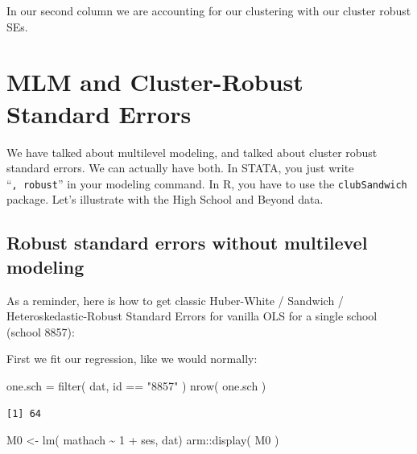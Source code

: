 \documentclass[
  letterpaper,
  DIV=11,
  numbers=noendperiod]{scrreprt}
\newenvironment{Shaded}{\begin{snugshade}}{\end{snugshade}}
\newcommand{\DecValTok}[1]{\textcolor[rgb]{0.25,0.63,0.44}{#1}}
\newcommand{\FunctionTok}[1]{\textcolor[rgb]{0.02,0.16,0.49}{#1}}
\newcommand{\NormalTok}[1]{\textcolor[rgb]{0.00,0.44,0.13}{#1}}
\newcommand{\OtherTok}[1]{\textcolor[rgb]{0.00,0.44,0.13}{#1}}
\newcommand{\SpecialCharTok}[1]{\textcolor[rgb]{0.25,0.44,0.63}{#1}}
\newcommand{\StringTok}[1]{\textcolor[rgb]{0.25,0.44,0.63}{#1}}
\begin{document}
In our second column we are accounting for our clustering with our
cluster robust SEs.

\hypertarget{mlm-and-cluster-robust-standard-errors}{%
\chapter{MLM and Cluster-Robust Standard
Errors}\label{mlm-and-cluster-robust-standard-errors}}

We have talked about multilevel modeling, and talked about cluster
robust standard errors. We can actually have both. In STATA, you just
write ``\texttt{,\ robust}'' in your modeling command. In R, you have to
use the \texttt{clubSandwich} package. Let's illustrate with the High
School and Beyond data.

\hypertarget{robust-standard-errors-without-multilevel-modeling}{%
\section{Robust standard errors without multilevel
modeling}\label{robust-standard-errors-without-multilevel-modeling}}

As a reminder, here is how to get classic Huber-White / Sandwich /
Heteroskedastic-Robust Standard Errors for vanilla OLS for a single
school (school 8857):

First we fit our regression, like we would normally:

\begin{Shaded}
\begin{Highlighting}[]
\NormalTok{one.sch }\OtherTok{=} \FunctionTok{filter}\NormalTok{( dat, id }\SpecialCharTok{==} \StringTok{"8857"}\NormalTok{ )}
\FunctionTok{nrow}\NormalTok{( one.sch )}
\end{Highlighting}
\end{Shaded}

\begin{verbatim}
[1] 64
\end{verbatim}

\begin{Shaded}
\begin{Highlighting}[]
\NormalTok{M0 }\OtherTok{\textless{}{-}} \FunctionTok{lm}\NormalTok{( mathach }\SpecialCharTok{\textasciitilde{}} \DecValTok{1} \SpecialCharTok{+}\NormalTok{ ses, dat) }
\NormalTok{arm}\SpecialCharTok{::}\FunctionTok{display}\NormalTok{( M0 )}
\end{Highlighting}
\end{Shaded}
\end{document}
